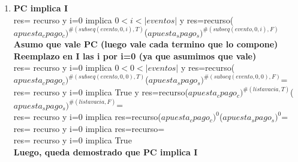 \documentclass[10pt,a4paper]{article}
\begin{document}
\begin{flushleft}
\begin{enumerate} \setlength\itemsep{0cm}
	\item \textbf{PC implica I}\\
	res= recurso y i=0 implica $0<i<|eventos|$ y res=recurso($apuesta_cpago_c)^{\#(subseq(evento,0,i),T)}$($apuesta_spago_s)^{\#(subseq(evento,0,i),F)}$\\
	\vspace{2mm}
	\textbf{Asumo que vale PC (luego vale cada termino que lo compone)}\\
	\vspace{2mm}
	\textbf{Reemplazo en I las i por i=0 (ya que asumimos que vale)}\\
	\vspace{2mm}
	res= recurso y i=0 implica $0<0<|eventos|$ y res=recurso($apuesta_cpago_c)^{\#(subseq(evento,0,0),T)}$($apuesta_spago_s)^{\#(subseq(evento,0,0),F)}$=\\
	\vspace{2mm}
	res= recurso y i=0 implica True y res=recurso($apuesta_cpago_c)^{\#(lista vacia,T)}$($apuesta_spago_s)^{\#(lista vacia,F)}$=\\
	\vspace{2mm}
	res= recurso y i=0 implica res=recurso($apuesta_cpago_c)^{0}$($apuesta_spago_s)^{0}$=\\
	\vspace{2mm}
	res= recurso y i=0 implica res=recurso=\\
	\vspace{2mm}
	res= recurso y i=0 implica True \\
	\vspace{2mm}
	\textbf{Luego, queda demostrado que PC implica I}
	

\end{enumerate}

\end{flushleft}
\end{document}
